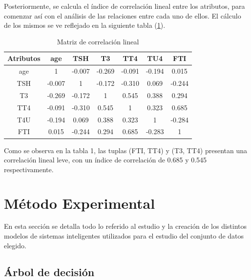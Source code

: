 \documentclass[osajnl,twocolumn,showpacs,superscriptaddress,10pt,floatfix]{revtex4-1} %
\begin{document}
Posteriormente, se calcula el índice de correlación lineal entre los atributos, para comenzar así con el análisis de las relaciones entre cada uno de ellos. El cálculo de los mismos se ve reflejado en la siguiente tabla (\ref{table:correlation_matrix}). \\

\begin{table}[h!]
    \centering
    \begin{tabular}{ccccccc}

        Atributos & age & TSH & T3 & TT4 & TU4 & FTI \\
        \hline
        age & 1 & -0.007 & -0.269 & -0.091 & -0.194 & 0.015 \\

        TSH & -0.007 & 1 & -0.172 & -0.310 & 0.069 & -0.244 \\

        T3 & -0.269 & -0.172 & 1 & 0.545 & 0.388 & 0.294 \\

        TT4 & -0.091 & -0.310 & 0.545 & 1 & 0.323 & 0.685 \\

        T4U & -0.194 & 0.069 & 0.388 & 0.323 & 1 & -0.284 \\

        FTI & 0.015 & -0.244 & 0.294 & 0.685 & -0.283 & 1 \\
        \hline
    \end{tabular}
    \caption{Matriz de correlación lineal}
    \label{table:correlation_matrix}
\end{table}

Como se observa en la tabla 1, las tuplas (FTI, TT4) y (T3, TT4) presentan una correlación lineal leve, con un índice de correlación de 0.685 y 0.545 respectivamente. \\

\section{Método Experimental}

En esta sección se detalla todo lo referido al estudio y la creación de los distintos modelos de sistemas inteligentes utilizados para el estudio del conjunto de datos elegido. \\

\subsection{Árbol de decisión}
\end{document}
